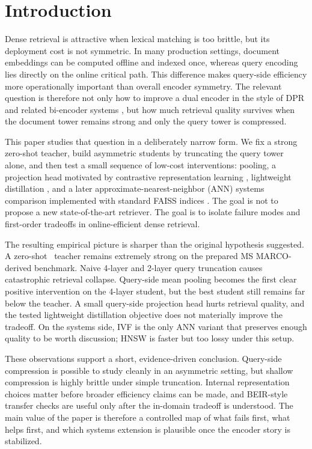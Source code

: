 \section{Introduction}

Dense retrieval is attractive when lexical matching is too brittle, but its deployment cost is not symmetric. In many production settings, document embeddings can be computed offline and indexed once, whereas query encoding lies directly on the online critical path. This difference makes query-side efficiency more operationally important than overall encoder symmetry. The relevant question is therefore not only how to improve a dual encoder in the style of DPR and related bi-encoder systems \cite{karpukhin-etal-2020-dense,reimers-gurevych-2019-sentence}, but how much retrieval quality survives when the document tower remains strong and only the query tower is compressed.

This paper studies that question in a deliberately narrow form. We fix a strong zero-shot teacher, build asymmetric students by truncating the query tower alone, and then test a small sequence of low-cost interventions: pooling, a projection head motivated by contrastive representation learning \cite{chen-etal-2020-simclr}, lightweight distillation \cite{huang-chen-2024-pairdistill}, and a later approximate-nearest-neighbor (ANN) systems comparison implemented with standard FAISS indices \cite{johnson-etal-2021-faiss,malkov-yashunin-2018-hnsw}. The goal is not to propose a new state-of-the-art retriever. The goal is to isolate failure modes and first-order tradeoffs in online-efficient dense retrieval.

The resulting empirical picture is sharper than the original hypothesis suggested. A zero-shot \bgebase\ teacher remains extremely strong on the prepared MS MARCO-derived benchmark. Naive 4-layer and 2-layer query truncation causes catastrophic retrieval collapse. Query-side mean pooling becomes the first clear positive intervention on the 4-layer student, but the best student still remains far below the teacher. A small query-side projection head hurts retrieval quality, and the tested lightweight distillation objective does not materially improve the tradeoff. On the systems side, IVF is the only ANN variant that preserves enough quality to be worth discussion; HNSW is faster but too lossy under this setup.

These observations support a short, evidence-driven conclusion. Query-side compression is possible to study cleanly in an asymmetric setting, but shallow compression is highly brittle under simple truncation. Internal representation choices matter before broader efficiency claims can be made, and BEIR-style transfer checks \cite{thakur-etal-2021-beir} are useful only after the in-domain tradeoff is understood. The main value of the paper is therefore a controlled map of what fails first, what helps first, and which systems extension is plausible once the encoder story is stabilized.
